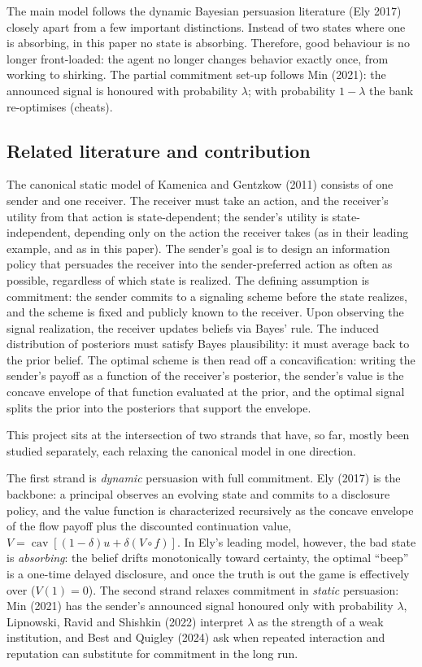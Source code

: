 \documentclass[12pt]{article}
\DeclareMathOperator{\cav}{cav}
\begin{document}
The main model follows the dynamic Bayesian persuasion literature (Ely 2017) closely apart from a few important distinctions. Instead of two states where one is absorbing, in this paper no state is absorbing. Therefore, good behaviour is no longer front-loaded: the agent no longer changes behavior exactly once, from working to shirking. The partial commitment set-up follows Min (2021): the announced signal is honoured with probability $\lambda$; with probability $1-\lambda$ the bank re-optimises (cheats).

\subsection{Related literature and contribution}\label{Literature}

The canonical static model of Kamenica and Gentzkow (2011) consists of one sender and one receiver. The receiver must take an action, and the receiver's utility from that action is state-dependent; the sender's utility is state-independent, depending only on the action the receiver takes (as in their leading example, and as in this paper). The sender's goal is to design an information policy that persuades the receiver into the sender-preferred action as often as possible, regardless of which state is realized. The defining assumption is commitment: the sender commits to a signaling scheme before the state realizes, and the scheme is fixed and publicly known to the receiver. Upon observing the signal realization, the receiver updates beliefs via Bayes' rule. The induced distribution of posteriors must satisfy Bayes plausibility: it must average back to the prior belief. The optimal scheme is then read off a concavification: writing the sender's payoff as a function of the receiver's posterior, the sender's value is the concave envelope of that function evaluated at the prior, and the optimal signal splits the prior into the posteriors that support the envelope.

This project sits at the intersection of two strands that have, so far, mostly been studied separately, each relaxing the canonical model in one direction.

The first strand is \emph{dynamic} persuasion with full commitment. Ely (2017) is the backbone: a principal observes an evolving state and commits to a disclosure policy, and the value function is characterized recursively as the concave envelope of the flow payoff plus the discounted continuation value, $V=\cav[(1-\delta)u+\delta(V\circ f)]$. In Ely's leading model, however, the bad state is \emph{absorbing}: the belief drifts monotonically toward certainty, the optimal ``beep'' is a one-time delayed disclosure, and once the truth is out the game is effectively over ($V(1)=0$). The second strand relaxes commitment in \emph{static} persuasion: Min (2021) has the sender's announced signal honoured only with probability $\lambda$, Lipnowski, Ravid and Shishkin (2022) interpret $\lambda$ as the strength of a weak institution, and Best and Quigley (2024) ask when repeated interaction and reputation can substitute for commitment in the long run.
\end{document}
